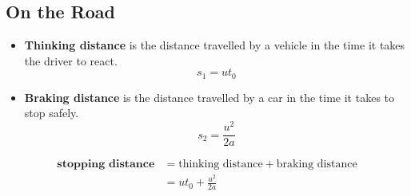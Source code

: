 \subsection{On the Road}
\begin{itemize}
    \item \textbf{Thinking distance} is the distance travelled by a vehicle in the time it takes the driver to react.
        $$s_1=ut_0$$
    \item \textbf{Braking distance} is the distance travelled by a car in the time it takes to stop safely.
        $$s_2=\frac{u^2}{2a}$$
\end{itemize}
\begin{align*}
    \textbf{stopping distance}&=\text{thinking distance}+\text{braking distance}\\
                              &=ut_0+\frac{u^2}{2a}
\end{align*}
